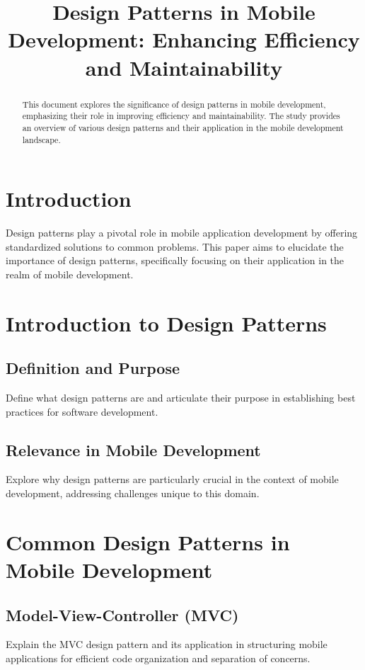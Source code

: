 \documentclass[conference]{IEEEtran}
\title{Design Patterns in Mobile Development: Enhancing Efficiency and Maintainability}
\author{\IEEEauthorblockN{Castillo Mendez Josue Leonel}
	\IEEEauthorblockA{UTT\\
		0322103691@ut-tijuana.edu.mx}}
\date{}
\begin{document}
	
	\maketitle
	
	\begin{abstract}
		This document explores the significance of design patterns in mobile development, emphasizing their role in improving efficiency and maintainability. The study provides an overview of various design patterns and their application in the mobile development landscape.
	\end{abstract}
	
	\section{Introduction}
	Design patterns play a pivotal role in mobile application development by offering standardized solutions to common problems. This paper aims to elucidate the importance of design patterns, specifically focusing on their application in the realm of mobile development.
	
	\section{Introduction to Design Patterns}
	\subsection{Definition and Purpose}
	Define what design patterns are and articulate their purpose in establishing best practices for software development.
	
	\subsection{Relevance in Mobile Development}
	Explore why design patterns are particularly crucial in the context of mobile development, addressing challenges unique to this domain.
	
	\section{Common Design Patterns in Mobile Development}
	\subsection{Model-View-Controller (MVC)}
	Explain the MVC design pattern and its application in structuring mobile applications for efficient code organization and separation of concerns.
	
\end{document}
